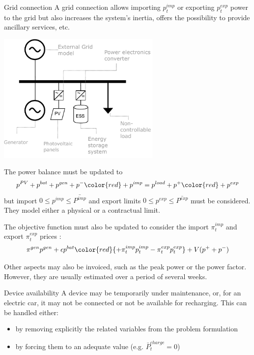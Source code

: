 \begin{frame}[allowframebreaks]{Grid connection}
    A grid connection allows importing $p^{imp}_t$ or exporting $p^{exp}_t$ power to the grid but also increases the system's inertia, offers the possibility to provide ancillary services, etc.
    \begin{center}
    \includegraphics[width=0.6\textwidth]{images/grid_tied_1.pdf}
    \end{center}
    
    The power balance must be updated to 
    $$p^{PV}+p^{bat} +p^{gen} + p^- {\color{red} + p^{imp}}  = p^{load} + p^+ {\color{red} + p^{exp}} $$
    but import $0 \leq p^{imp} \leq \bar{P^{imp}}$ and export limits $0 \leq p^{exp} \leq \bar{P^{exp}}$ must be considered. 
    They model either a physical or a contractual limit.

    The objective function must also be updated to consider the import $\pi^{imp}_t$ and export $\pi^{exp}_t$ prices : 
    $$\pi^{gen} p^{gen}  + \epsilon p^{bat} {\color{red}{+ \pi^{imp}_t p^{imp}_t - \pi^{exp}_t p^{exp}_t}} + V (p^+ + p^-)$$

    Other aspects may also be invoiced, such as the peak power or the power factor. However, they are usually estimated over a period of several weeks.
\end{frame}

\begin{frame}{Device availability}
    A device may be temporarily under maintenance, or, for an electric car, it may not be connected or not be available for recharging.
    This can be handled either:
    \begin{itemize}
        \item by removing explicitly the related variables from the problem formulation
        \item by forcing them to an adequate value (e.g. $\bar{P}^{charge}_t = 0$)        
    \end{itemize}
\end{frame}

